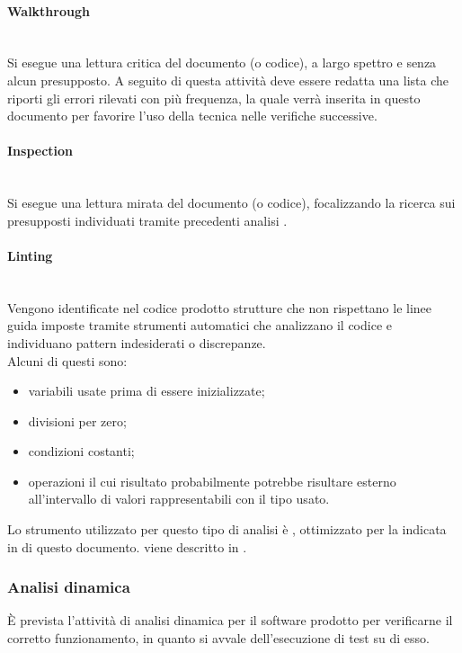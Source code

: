 \paragraph{Walkthrough} \mbox{}\\
Si esegue una lettura critica del documento (o codice), a largo spettro e senza alcun presupposto. A seguito di questa attività deve essere redatta una lista che riporti gli errori rilevati con più frequenza, la quale verrà inserita in questo documento per favorire l'uso della tecnica  nelle verifiche successive.

\paragraph{Inspection} \mbox{}\\
Si esegue una lettura mirata del documento (o codice), focalizzando la ricerca sui presupposti individuati tramite precedenti analisi .

\paragraph{Linting}\mbox{}\\
Vengono identificate nel codice prodotto strutture che non rispettano le linee guida imposte tramite strumenti automatici che analizzano il codice e individuano pattern indesiderati o discrepanze.\\
Alcuni di questi sono:\begin{itemize}
	\item variabili usate prima di essere inizializzate;  
	\item divisioni per zero;
	\item condizioni costanti;
	\item operazioni il cui risultato probabilmente potrebbe risultare esterno all'intervallo di valori rappresentabili con il tipo usato.
\end{itemize}
Lo strumento utilizzato per questo tipo di analisi è , ottimizzato per la  indicata in  di questo documento.  viene descritto in .

\subsubsection{Analisi dinamica}
\`{E} prevista l’attività di analisi dinamica per il software prodotto per verificarne il corretto funzionamento, in quanto si avvale dell'esecuzione di test su di esso.
















